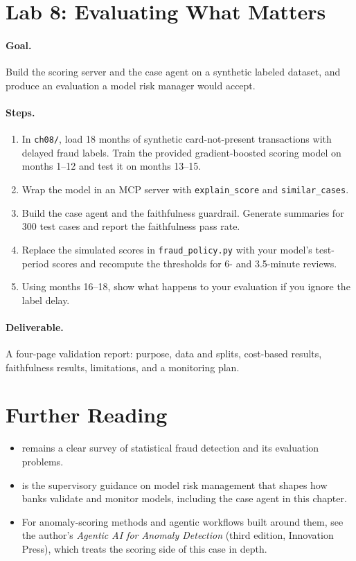 \section*{Lab 8: Evaluating What Matters}

\paragraph{Goal.} Build the scoring server and the case agent on a synthetic labeled dataset, and produce an evaluation a model risk manager would accept.

\paragraph{Steps.}
\begin{enumerate}[itemsep=2pt]
  \item In \texttt{ch08/}, load 18 months of synthetic card-not-present transactions with delayed fraud labels. Train the provided gradient-boosted scoring model on months 1--12 and test it on months 13--15.
  \item Wrap the model in an MCP server with \texttt{explain\_score} and \texttt{similar\_cases}.
  \item Build the case agent and the faithfulness guardrail. Generate summaries for 300 test cases and report the faithfulness pass rate.
  \item Replace the simulated scores in \texttt{fraud\_policy.py} with your model's test-period scores and recompute the thresholds for 6- and 3.5-minute reviews.
  \item Using months 16--18, show what happens to your evaluation if you ignore the label delay.
\end{enumerate}

\paragraph{Deliverable.} A four-page validation report: purpose, data and splits, cost-based results, faithfulness results, limitations, and a monitoring plan.

\section*{Further Reading}

\begin{itemize}[itemsep=2pt]
  \item \citet{bolton2002fraud} remains a clear survey of statistical fraud detection and its evaluation problems.
  \item \citet{fed2011sr117} is the supervisory guidance on model risk management that shapes how banks validate and monitor models, including the case agent in this chapter.
  \item For anomaly-scoring methods and agentic workflows built around them, see the author's \emph{Agentic AI for Anomaly Detection} (third edition, Innovation Press), which treats the scoring side of this case in depth.
\end{itemize}
